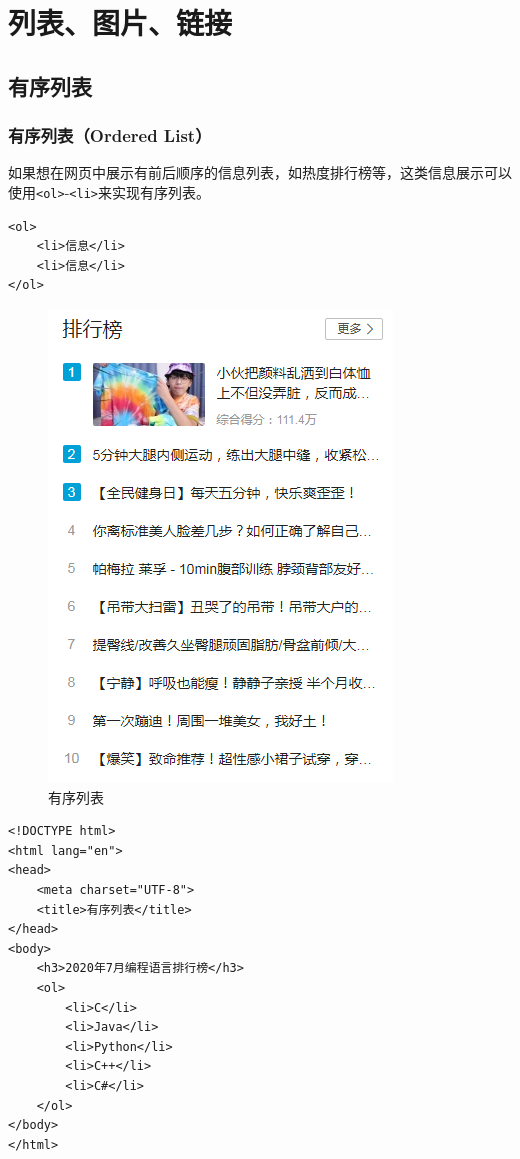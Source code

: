 \chapter{列表、图片、链接}

\section{有序列表}

\subsection{有序列表（Ordered List）}

如果想在网页中展示有前后顺序的信息列表，如热度排行榜等，这类信息展示可以使用\lstinline|<ol>|-\lstinline|<li>|来实现有序列表。 \\

\begin{lstlisting}[style=htmlcssjs]
<ol>
    <li>信息</li>
    <li>信息</li>
</ol>
\end{lstlisting}

\begin{figure}[H]
    \centering
    \includegraphics[scale=0.7]{img/C3/3-1/1.png}
    \caption{有序列表}
\end{figure}

\begin{lstlisting}[style=htmlcssjs, title=有序列表]
<!DOCTYPE html>
<html lang="en">
<head>
    <meta charset="UTF-8">
    <title>有序列表</title>
</head>
<body>
    <h3>2020年7月编程语言排行榜</h3>
    <ol>
        <li>C</li>
        <li>Java</li>
        <li>Python</li>
        <li>C++</li>
        <li>C#</li>
    </ol>
</body>
</html>
\end{lstlisting}


